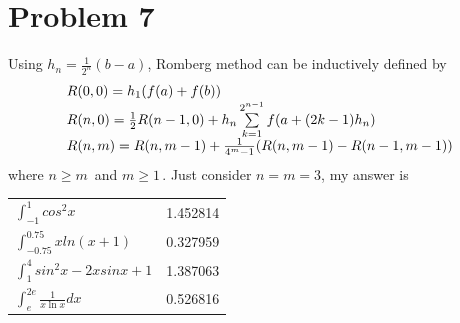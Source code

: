 \documentclass{article}
\begin{document}
\section{Problem 7}
Using $h_{n}={\tfrac {1}{2^{n}}}(b-a)$, Romberg method can be inductively defined by
\[\begin{array}{l}
R(0,0) = {h_1}(f(a) + f(b))\\
R(n,0) = {\textstyle{1 \over 2}}R(n - 1,0) + {h_n}\sum\limits_{k = 1}^{{2^{n - 1}}} f (a + (2k - 1){h_n})\\
R(n,m) = R(n,m - 1) + {\textstyle{1 \over {{4^m} - 1}}}(R(n,m - 1) - R(n - 1,m - 1))\\
\end{array}\]
where $n\geq m\, $ and $ m\geq 1\,$.
Just consider $n=m=3$, my answer is
\begin{center}\begin{tabular}{ll}
\hline
$\int_{-1}^{1}{cos^2x}$&{ 1.452814}\\
$\int_{-0.75}^{0.75}{xln(x+1)}$&{ 0.327959}\\
$\int_1^4{sin^2x-2xsinx+1}$&{ 1.387063}\\
$\int_e^{2e} {\frac{1}{{x\ln x}}dx} $&{ 0.526816}\\
\hline
\end{tabular}
\end{center}

\end{document}

